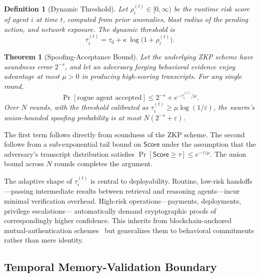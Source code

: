 \documentclass[conference]{IEEEtran}
\newtheorem{theorem}{Theorem}
\newtheorem{definition}{Definition}
\begin{document}
\begin{definition}[Dynamic Threshold]
Let $\rho_i^{(t)} \in [0, \infty)$ be the runtime risk score of agent
$i$ at time $t$, computed from prior anomalies, blast radius of the
pending action, and network exposure. The dynamic threshold is
\begin{equation}
\tau_i^{(t)} = \tau_0 + \kappa\,\log\bigl(1 + \rho_i^{(t)}\bigr).
\end{equation}
\end{definition}

\begin{theorem}[Spoofing-Acceptance Bound]
Let the underlying ZKP scheme have soundness error $2^{-s}$, and
let an adversary forging behavioral evidence enjoy advantage at most
$\mu > 0$ in producing high-scoring transcripts. For any single
round,
\begin{equation}
\Pr[\text{rogue agent accepted}] \leq 2^{-s} + e^{-\tau_i^{(t)}/\mu}.
\end{equation}
Over $N$ rounds, with the threshold calibrated as
$\tau_i^{(t)} \geq \mu\log(1/\varepsilon)$, the swarm's
union-bounded spoofing probability is at most
$N(2^{-s} + \varepsilon)$.
\end{theorem}

\begin{IEEEproof}
The first term follows directly from soundness of the ZKP scheme.
The second follows from a sub-exponential tail bound on $\mathsf{Score}$
under the assumption that the adversary's transcript distribution
satisfies $\Pr[\mathsf{Score} \geq \tau] \leq e^{-\tau/\mu}$.
The union bound across $N$ rounds completes the argument.
\end{IEEEproof}

The adaptive shape of $\tau_i^{(t)}$ is central to deployability.
Routine, low-risk handoffs---passing intermediate results between
retrieval and reasoning agents---incur minimal verification overhead.
High-risk operations---payments, deployments, privilege escalations---
automatically demand cryptographic proofs of correspondingly higher
confidence. This inherits from blockchain-anchored mutual-authentication
schemes~\cite{ref:zpma2024} but generalizes them to behavioral
commitments rather than mere identity.

\subsection{Temporal Memory-Validation Boundary}
\label{subsec:temporal}
\end{document}
